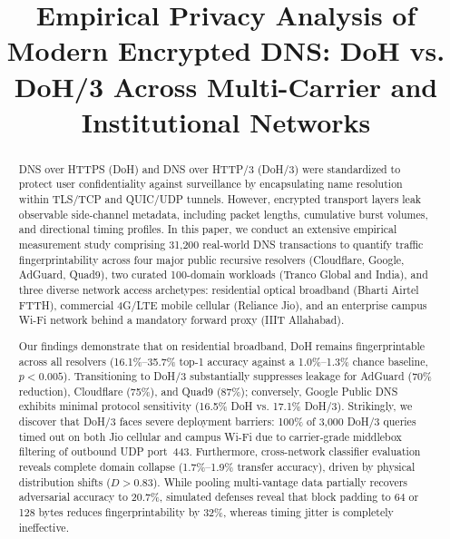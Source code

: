 \documentclass[conference,10pt]{IEEEtran}
\begin{document}
\title{Empirical Privacy Analysis of Modern Encrypted DNS: DoH vs. DoH/3 Across Multi-Carrier and Institutional Networks}

\author{
\and
{}
\and
{}
}

\maketitle

\begin{abstract}
DNS over HTTPS (DoH) and DNS over HTTP/3 (DoH/3) were standardized to protect user confidentiality against surveillance by encapsulating name resolution within TLS/TCP and QUIC/UDP tunnels. However, encrypted transport layers leak observable side-channel metadata, including packet lengths, cumulative burst volumes, and directional timing profiles. In this paper, we conduct an extensive empirical measurement study comprising 31,200 real-world DNS transactions to quantify traffic fingerprintability across four major public recursive resolvers (Cloudflare, Google, AdGuard, Quad9), two curated 100-domain workloads (Tranco Global and India), and three diverse network access archetypes: residential optical broadband (Bharti Airtel FTTH), commercial 4G/LTE mobile cellular (Reliance Jio), and an enterprise campus Wi-Fi network behind a mandatory forward proxy (IIIT Allahabad). 

Our findings demonstrate that on residential broadband, DoH remains fingerprintable across all resolvers (16.1\%--35.7\% top-1 accuracy against a 1.0\%--1.3\% chance baseline, $p < 0.005$). Transitioning to DoH/3 substantially suppresses leakage for AdGuard (70\% reduction), Cloudflare (75\%), and Quad9 (87\%); conversely, Google Public DNS exhibits minimal protocol sensitivity (16.5\% DoH vs. 17.1\% DoH/3). Strikingly, we discover that DoH/3 faces severe deployment barriers: 100\% of 3,000 DoH/3 queries timed out on both Jio cellular and campus Wi-Fi due to carrier-grade middlebox filtering of outbound UDP port~443. Furthermore, cross-network classifier evaluation reveals complete domain collapse (1.7\%--1.9\% transfer accuracy), driven by physical distribution shifts ($D > 0.83$). While pooling multi-vantage data partially recovers adversarial accuracy to 20.7\%, simulated defenses reveal that block padding to 64 or 128 bytes reduces fingerprintability by 32\%, whereas timing jitter is completely ineffective.
\end{abstract}
\end{document}
